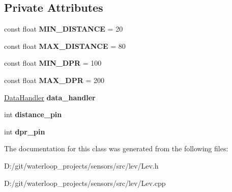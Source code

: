 \subsection*{Private Attributes}
\begin{DoxyCompactItemize}
\item 
\mbox{\label{class_lev_a4b4ad9bac339fe4c4dd2b997788868c6}} 
const float {\bfseries M\+I\+N\+\_\+\+D\+I\+S\+T\+A\+N\+CE} = 20
\item 
\mbox{\label{class_lev_ac4efb366426d13dae04a5e004de49217}} 
const float {\bfseries M\+A\+X\+\_\+\+D\+I\+S\+T\+A\+N\+CE} = 80
\item 
\mbox{\label{class_lev_ab09cbc9ce1c5b15945768a6e1a43aefc}} 
const float {\bfseries M\+I\+N\+\_\+\+D\+PR} = 100
\item 
\mbox{\label{class_lev_aad248cad110e4bb2d099be787f74031f}} 
const float {\bfseries M\+A\+X\+\_\+\+D\+PR} = 200
\item 
\mbox{\label{class_lev_a24660afe260a543ebcd44afdb5f99e59}} 
\hyperlink{class_data_handler}{Data\+Handler} {\bfseries data\+\_\+handler}
\item 
\mbox{\label{class_lev_ac8451fe9be38f7cb4e6fe0008ae14526}} 
int {\bfseries distance\+\_\+pin}
\item 
\mbox{\label{class_lev_a69fa73b8eacd8a9fcc6080b647d75d5c}} 
int {\bfseries dpr\+\_\+pin}
\end{DoxyCompactItemize}


The documentation for this class was generated from the following files\+:\begin{DoxyCompactItemize}
\item 
D\+:/git/waterloop\+\_\+projects/sensors/src/lev/Lev.\+h\item 
D\+:/git/waterloop\+\_\+projects/sensors/src/lev/Lev.\+cpp\end{DoxyCompactItemize}
